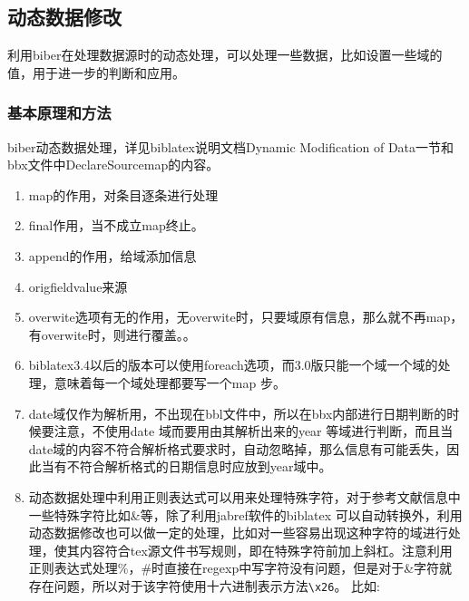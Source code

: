 \subsection{动态数据修改}
利用biber在处理数据源时的动态处理，可以处理一些数据，比如设置一些域的值，用于进一步的判断和应用。

\subsubsection{基本原理和方法}\label{sec:dynamic:modify}
biber动态数据处理，详见biblatex说明文档Dynamic Modification of Data一节和bbx文件中DeclareSourcemap的内容。
  \begin{enumerate}
    \item map的作用，对条目逐条进行处理
    \item final作用，当不成立map终止。
    \item append的作用，给域添加信息
    \item origfieldvalue来源
    \item overwite选项有无的作用，无overwite时，只要域原有信息，那么就不再map，有overwite时，则进行覆盖。。
    \item biblatex3.4以后的版本可以使用foreach选项，而3.0版只能一个域一个域的处理，意味着每一个域处理都要写一个map 步。
    \item date域仅作为解析用，不出现在bbl文件中，所以在bbx内部进行日期判断的时候要注意，不使用date 域而要用由其解析出来的year 等域进行判断，而且当date域的内容不符合解析格式要求时，自动忽略掉，那么信息有可能丢失，因此当有不符合解析格式的日期信息时应放到year域中。
    \item 动态数据处理中利用正则表达式可以用来处理特殊字符，对于参考文献信息中一些特殊字符比如\&等，除了利用jabref软件的biblatex 可以自动转换外，利用动态数据修改也可以做一定的处理，比如对一些容易出现这种字符的域进行处理，使其内容符合tex源文件书写规则，即在特殊字符前加上斜杠。注意利用正则表达式处理\%，\#时直接在regexp中写字符没有问题，但是对于\&字符就存在问题，所以对于该字符使用十六进制表示方法\verb|\x26|。 比如:

    \begin{texlist}
    \DeclareStyleSourcemap{
        \maps[datatype=bibtex]{
            \map[overwrite, foreach={title,booktitle,journaltitle,journal,publisher,address,location,institution,organization}]{
                \step[fieldsource=\regexp{$MAPLOOP}, match=\regexp{([^\\])\#}, replace=\regexp{$1\\\#}]
            }
            \map[overwrite, foreach={title,booktitle,journaltitle,journal,publisher,address,location,institution,organization}]{
                \step[fieldsource=\regexp{$MAPLOOP}, match=\regexp{([^\\])\%}, replace=\regexp{$1\\\%}]
            }
            \map[overwrite, foreach={title,booktitle,journaltitle,journal,publisher,%
            address,location,institution,organization}]{
                \step[fieldsource=\regexp{$MAPLOOP}, match=\regexp{([^\\])\x26}, replace=\regexp{$1\\\x26}]
            }
        }
    }


\end{texlist}
\end{enumerate}
